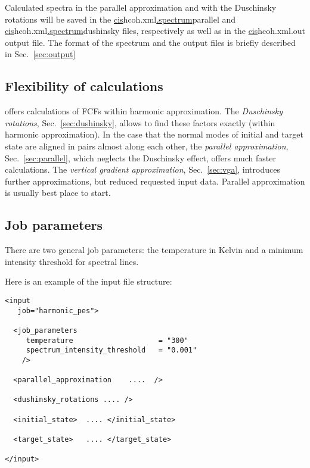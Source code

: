 \documentclass[11pt]{article}
\begin{document}
Calculated spectra in the parallel approximation 
and with the Duschinsky rotations will be saved in the \ul{cis}{hcoh.xml}\ul{.spectrum}{parallel} and
\ul{cis}{hcoh.xml}\ul{.spectrum}{dushinsky} files, respectively as well as in the \ul{cis}{hcoh.xml.out} output file. 
The format of the spectrum and the output files is briefly described in Sec.~\ref{sec:output}

\subsection{Flexibility of calculations}
\label{sec:quick_start:approximations}

\ezFCF{} offers calculations of FCFs within harmonic approximation. The 
\emph{Duschinsky rotations}, Sec.~\ref{sec:dushinsky}, allows to find 
these factors exactly (within harmonic approximation). In the case that the 
normal modes of initial and target state are aligned in pairs almost along 
each other, the \emph{parallel approximation}, Sec.~\ref{sec:parallel}, which 
neglects the Duschinsky effect, offers much faster calculations. The 
\emph{vertical gradient approximation}, Sec.~\ref{sec:vga}, introduces
further approximations, but reduced requested input data. Parallel 
approximation is usually best place to start.

\subsection{Job parameters}
\label{sec:parameters}

There are two general job parameters: the temperature in Kelvin 
and a minimum intensity threshold for spectral lines.

Here is an example of the input file structure:
\begin{lstlisting}[frame=single,framerule=0pt]
<input 
   job="harmonic_pes">

  <job_parameters 
     temperature                    = "300"
     spectrum_intensity_threshold   = "0.001"
    />

  <parallel_approximation    ....  />

  <dushinsky_rotations .... />

  <initial_state>  .... </initial_state>

  <target_state>   .... </target_state>

</input>
\end{lstlisting}
\end{document}
